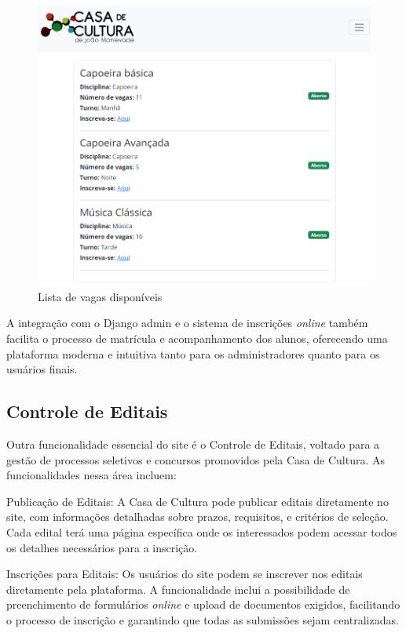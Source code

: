 \begin{figure}[htb]
	\caption{\label{fig_grafico}Lista de vagas disponíveis}
	\begin{center}
	    \includegraphics[scale=0.25]{./img/lista_turmas.png}
	\end{center}
\end{figure}

A integração com o Django admin e o sistema de inscrições \textit{online} também facilita o processo de matrícula e acompanhamento dos alunos, oferecendo uma plataforma moderna e intuitiva tanto para os administradores quanto para os usuários finais.

\subsection{Controle de Editais}

Outra funcionalidade essencial do site é o Controle de Editais, voltado para a gestão de processos seletivos e concursos promovidos pela Casa de Cultura. As funcionalidades nessa área incluem:

Publicação de Editais: A Casa de Cultura pode publicar editais diretamente no site, com informações detalhadas sobre prazos, requisitos, e critérios de seleção. Cada edital terá uma página específica onde os interessados podem acessar todos os detalhes necessários para a inscrição.

Inscrições para Editais: Os usuários do site podem se inscrever nos editais diretamente pela plataforma. A funcionalidade inclui a possibilidade de preenchimento de formulários \textit{online} e upload de documentos exigidos, facilitando o processo de inscrição e garantindo que todas as submissões sejam centralizadas.


